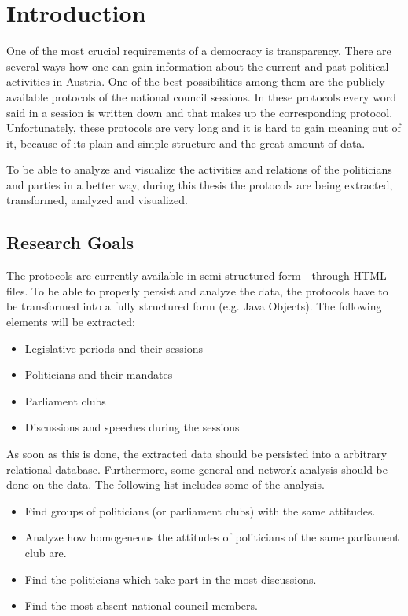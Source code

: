 \chapter{Introduction}
\label{sec:introduction}
One of the most crucial requirements of a democracy is transparency. There are several ways how one can gain information about the current and past political activities in Austria. One of the best possibilities among them are the publicly available protocols of the national council sessions. In these protocols every word said in a session is written down and that makes up the corresponding protocol. Unfortunately, these protocols are very long and it is hard to gain meaning out of it, because of its plain and simple structure and the great amount of data.

To be able to analyze and visualize the activities and relations of the politicians and parties in a better way, during this thesis the protocols are being extracted, transformed, analyzed and visualized.

\section{Research Goals}
The protocols are currently available in semi-structured form - through HTML files. To be able to properly persist and analyze the data, the protocols have to be transformed into a fully structured form (e.g. Java Objects). The following elements will be extracted:
\begin{itemize}
  \item Legislative periods and their sessions
  \item Politicians and their mandates
  \item Parliament clubs
  \item Discussions and speeches during the sessions
\end{itemize}

As soon as this is done, the extracted data should be persisted into a arbitrary relational database. Furthermore, some general and network analysis should be done on the data. The following list includes some of the analysis.
\begin{itemize}
  \item Find groups of politicians (or parliament clubs) with the same attitudes.
  \item Analyze how homogeneous the attitudes of politicians of the same parliament club are.
  \item Find the politicians which take part in the most discussions.
  \item Find the most absent national council members.
\end{itemize}

